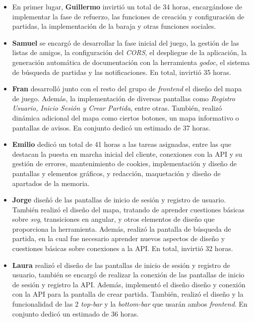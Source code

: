 \documentclass[11pt, a4paper, titlepage]{article}
\begin{document}
\begin{itemize}
    \item En primer lugar, \textbf{Guillermo} invirtió un total de 34 horas, encargándose de implementar la fase de refuerzo, las funciones de creación y configuración de partidas, la implementación de la baraja y otras funciones sociales.
    
    \item \textbf{Samuel} se encargó de desarrollar la fase inicial del juego, la gestión de las listas de amigos, la configuración del \textit{CORS}, el despliegue de la aplicación, la generación automática de documentación con la herramienta \textit{godoc}, el sistema de búsqueda de partidas y las notificaciones. En total, invirtió 35 horas.
    
    \item \textbf{Fran} desarrolló junto con el resto del grupo de \textit{frontend} el diseño del mapa de juego. Además, la implementación de diversas pantallas como \textit{Registro Usuario, Inicio Sesión y Crear Partida}, entre otras. También, realizó dinámica adicional del mapa como ciertos botones, un mapa informativo o pantallas de avisos. En conjunto dedicó un estimado de 37 horas.
    
    \item \textbf{Emilio} dedicó un total de 41 horas a las tareas asignadas, entre las que destacan la puesta en marcha inicial del cliente, conexiones con la API y su gestión de errores, mantenimiento de cookies, implementación y diseño de pantallas y elementos gráficos, y redacción, maquetación y diseño de apartados de la memoria.
    
    \item \textbf{Jorge} diseñó de las pantallas de inicio de sesión y registro de usuario. También realizó el diseño del mapa, tratando de aprender cuestiones básicas sobre \textit{svg}, transiciones en angular, y otros elementos de diseño que proporciona la herramienta. Además, realizó la pantalla de búsqueda de partida, en la cual fue necesario aprender nuevos aspectos de diseño y cuestiones básicas sobre conexiones a la API. En total, invirtió 32 horas.

    \item \textbf{Laura} realizó el diseño de las pantallas de inicio de sesión y registro de usuario, también se encargó de realizar la conexión de las pantallas de inicio de sesión y registro la API. Además, implementó el diseño diseño y conexión con la API para la pantalla de crear partida. También, realizó el diseño y la funcionalidad de las 2 \textit{top-bar} y la \textit{bottom-bar} que usarán ambos \textit{frontend}. En conjunto dedicó un estimado de 36 horas.
\end{itemize}
\end{document}
